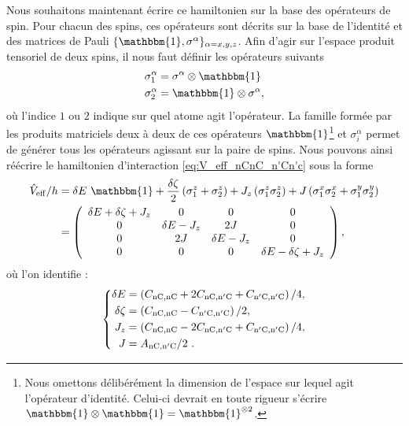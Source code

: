 Nous souhaitons maintenant écrire ce hamiltonien sur la base des opérateurs de spin.
Pour chacun des spins, ces opérateurs sont décrits sur la base de l'identité et des matrices de Pauli $\{\mathbbm{1},\sigma^\alpha \}_{\alpha=x,y,z}$.
Afin d'agir sur l'espace produit tensoriel de deux spins, il nous faut définir les opérateurs suivants
\begin{equation}
\label{eq:Pauli_tensor_space}
\begin{aligned}
\sigma_1^\alpha &= \sigma^\alpha \otimes \mathbbm{1} \\
\sigma_2^\alpha &= \mathbbm{1} \otimes \sigma^\alpha ,
\end{aligned}
\end{equation}
où l'indice $1$ ou $2$ indique sur quel atome agit l'opérateur.
La famille formée par les produits matriciels deux à deux de ces opérateurs $\mathbbm{1}$\footnote{
Nous omettons délibérément la dimension de l'espace sur lequel agit l'opérateur d'identité. Celui-ci devrait en toute rigueur s'écrire $\mathbbm{1}\otimes \mathbbm{1} = \mathbbm{1}^{\otimes 2}$.
} et $\sigma_i^\alpha$ permet de générer tous les opérateurs agissant sur la paire de spins.
Nous pouvons ainsi réécrire le hamiltonien d'interaction \eqref{eq:V_eff_nCnC_n'Cn'c} sous la forme
%
\begin{equation}
\label{eq:Veff_2at_Pauli}
\begin{aligned}
\hat{V}_{\mathrm{eff}}/h &= \delta E~\mathbbm{1}
+ \frac{\delta\zeta}{2}\left( \sigma_1^z + \sigma_2^z \right)
+ J_z\left( \sigma_1^z \sigma_2^z \right)
+ J \left( \sigma_1^x \sigma_2^x + \sigma_1^y \sigma_2^y \right) \\
&= \left( \begin{array}{cccc}
\delta E + \delta \zeta + J_z & 0 & 0 & 0 \\
0 & \delta E - J_z & 2J & 0 \\
0 & 2J & \delta E - J_z & 0 \\
0 & 0 & 0 & \delta E - \delta \zeta + J_z \\
\end{array} \right),
\end{aligned}
\end{equation}
%
où l'on identifie :
%
\begin{equation}
\label{eq:ident_XXZ}
\left\{
\begin{aligned}
\delta E &= \left( C_{\mathrm{nC},\mathrm{nC}} + 2C_{\mathrm{nC},\mathrm{n'C}} + C_{\mathrm{n'C},\mathrm{n'C}} \right)/4, \\
\delta \zeta &= \left( C_{\mathrm{nC},\mathrm{nC}} - C_{\mathrm{n'C},\mathrm{n'C}} \right)/2, \\
J_z &= \left( C_{\mathrm{nC},\mathrm{nC}} - 2C_{\mathrm{nC},\mathrm{n'C}} + C_{\mathrm{n'C},\mathrm{n'C}} \right)/4, \\
J &= A_{\mathrm{nC},\mathrm{n'C}} /2~.
\end{aligned} \right.
\end{equation}
